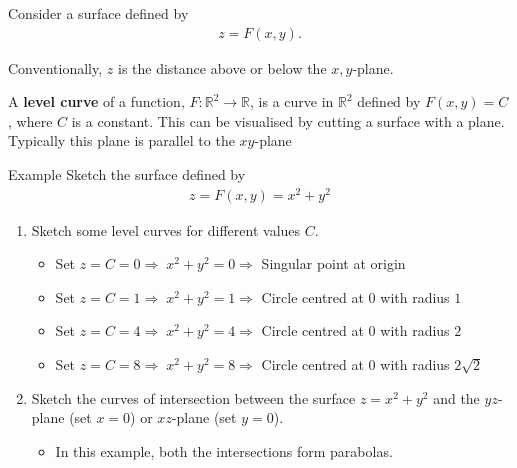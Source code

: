 \documentclass{report}
\begin{document}
			Consider a surface defined by 
				\begin{align*}
					z = F(x,y).
				\end{align*}

			Conventionally, $z$ is the distance above or below the $x,y$-plane.

			A \textbf{level curve} of a function, $F:\mathbb{R}^2 \to \mathbb{R}$, is a curve in $\mathbb{R}^2$ defined by $F(x,y) = C$, where $C$ is a constant. This can be visualised by cutting a surface with a plane. Typically this plane is parallel to the $xy$-plane

			\begin{question}{Example}
				Sketch the surface defined by
					\begin{align*}
						z = F(x,y) = x^2 + y^2
					\end{align*}

				\begin{enumerate}
					\item Sketch some level curves for different values $C$.
						\begin{itemize}
							\item Set $z = C = 0 \Rightarrow \; x^2 + y^2 = 0 \Rightarrow$ Singular point at origin
							\item Set $z = C = 1 \Rightarrow \; x^2 + y^2 = 1 \Rightarrow$ Circle centred at 0 with radius $1$
							\item Set $z = C = 4 \Rightarrow \; x^2 + y^2 = 4 \Rightarrow$ Circle centred at 0 with radius $2$
							\item Set $z = C = 8 \Rightarrow \; x^2 + y^2 = 8 \Rightarrow$ Circle centred at 0 with radius $2 \sqrt{2}$
						\end{itemize}
					\item Sketch the curves of intersection between the surface $z = x^2 + y^2$ and the $yz$-plane (set $x = 0$) or $xz$-plane (set $y = 0$).
						\begin{itemize}
							\item In this example, both the intersections form parabolas.
						\end{itemize}
				\end{enumerate}
			\end{question}
\end{document}
